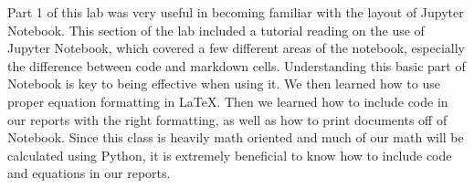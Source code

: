 Part 1 of this lab was very useful in becoming familiar with the layout of Jupyter Notebook. This section of the lab included a tutorial reading on the use of Jupyter Notebook, which covered a few different areas of the notebook, especially the difference between code and markdown cells. Understanding this basic part of Notebook is key to being effective when using it. We then learned how to use proper equation formatting in LaTeX. Then we learned how to include code in our reports with the right formatting, as well as how to print documents off of Notebook. Since this class is heavily math oriented and much of our math will be calculated using Python, it is extremely beneficial to know how to include code and equations in our reports.